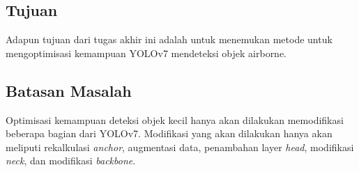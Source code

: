 \subsection{Tujuan}
    Adapun tujuan dari tugas akhir ini adalah untuk menemukan metode untuk mengoptimisasi kemampuan YOLOv7 mendeteksi objek airborne.

\subsection{Batasan Masalah}
    Optimisasi kemampuan deteksi objek kecil hanya akan dilakukan memodifikasi beberapa bagian dari YOLOv7.
    Modifikasi yang akan dilakukan hanya akan meliputi rekalkulasi \emph{anchor}, augmentasi data, penambahan layer \emph{head}, modifikasi \emph{neck}, dan modifikasi \emph{backbone}.
